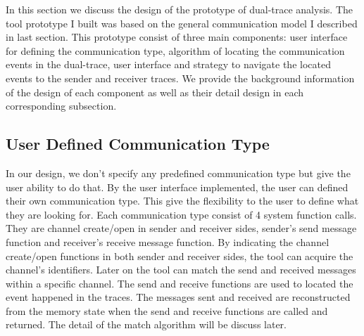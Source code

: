 \label{chapter:newsol}

In this section we discuss the design of the prototype of dual-trace analysis. The tool prototype I built was based on the general communication model I described in last section.
This prototype consist of three main components: user interface for defining the communication type, algorithm of locating the communication events in the dual-trace, user interface and strategy to navigate the located events to the sender and receiver traces. We provide the background information of the design of each component as well as their detail design in each corresponding subsection.
\subsection{User Defined Communication Type}
In our design, we don't specify any predefined communication type but give the user ability to do that. By the user interface implemented, the user can defined their own communication type. This give the flexibility to the user to define what they are looking for. Each communication type consist of 4 system function calls. They are channel create/open in sender and receiver sides, sender's send message function and receiver's receive message function. By indicating the channel create/open functions in both sender and receiver sides, the tool can acquire the channel's identifiers. Later on the tool can match the send and received messages within a specific channel. The send and receive functions are used to located the event happened in the traces. The messages sent and received are reconstructed from the memory state when the send and receive functions are called and returned. The detail of the match algorithm will be discuss later.

